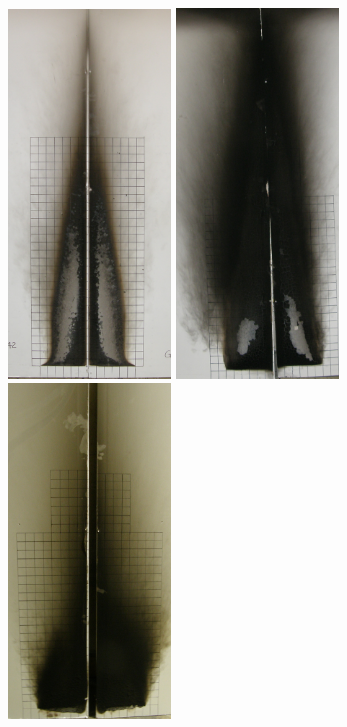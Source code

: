 \documentclass[twoside]{uocthesis}
\begin{document}
{\begin{figure}[p]
	\includegraphics[width=1.7in]{../Figures/C_PTGBNG_42}
	\includegraphics[width=1.7in]{../Figures/C_PTGBGAS_51_10c}
	\includegraphics[width=1.7in]{../Figures/C_PTGBPUF_11} \\


\end{figure}}
\end{document}
